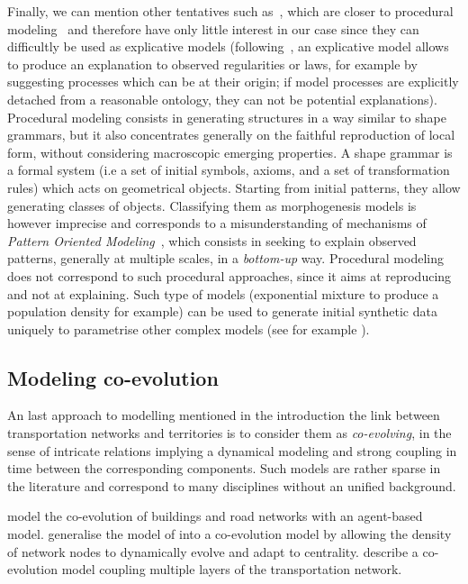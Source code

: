 \documentclass[10pt]{article}
\begin{document}
Finally, we can mention other tentatives such as~\cite{de2007netlogo,yamins2003growing}, which are closer to procedural modeling~\cite{lechner2004procedural,watson2008procedural} and therefore have only little interest in our case since they can difficultly be used as explicative models (following~\cite{varenne2017theories}, an explicative model allows to produce an explanation to observed regularities or laws, for example by suggesting processes which can be at their origin; if model processes are explicitly detached from a reasonable ontology, they can not be potential explanations). Procedural modeling consists in generating structures in a way similar to shape grammars, but it also concentrates generally on the faithful reproduction of local form, without considering macroscopic emerging properties. A shape grammar is a formal system (i.e a set of initial symbols, axioms, and a set of transformation rules) which acts on geometrical objects. Starting from initial patterns, they allow generating classes of objects. Classifying them as morphogenesis models is however imprecise and corresponds to a misunderstanding of mechanisms of \emph{Pattern Oriented Modeling}~\cite{grimm2005pattern}, which consists in seeking to explain observed patterns, generally at multiple scales, in a \emph{bottom-up} way. Procedural modeling does not correspond to such procedural approaches, since it aims at reproducing and not at explaining. Such type of models (exponential mixture to produce a population density for example) can be used to generate initial synthetic data uniquely to parametrise other complex models (see for example \cite{raimbault2019second}).


\subsection{Modeling co-evolution}

An last approach to modelling mentioned in the introduction the link between transportation networks and territories is to consider them as \emph{co-evolving}, in the sense of intricate relations implying a dynamical modeling and strong coupling in time between the corresponding components. Such models are rather sparse in the literature and correspond to many disciplines without an unified background.


\cite{achibet2014model} model the co-evolution of buildings and road networks with an agent-based model. \cite{barthelemy2009co} generalise the model of \cite{barthelemy2008modeling} into a co-evolution model by allowing the density of network nodes to dynamically evolve and adapt to centrality. \cite{ding2017heuristic} describe a co-evolution model coupling multiple layers of the transportation network.
\end{document}
